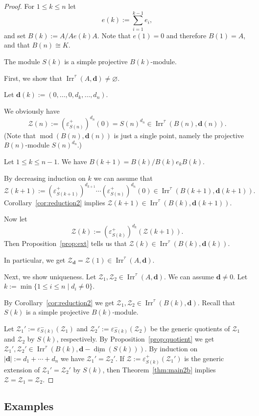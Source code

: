 \documentclass[12pt,reqno]{amsart}
\theoremstyle{definition}
\newcommand{\bd}{\mathbf{d}}
\newcommand{\md}{\operatorname{mod}}
\newcommand{\dimv}{\underline{\dim}}
\newcommand{\irr}{\operatorname{Irr}}
\newcommand{\calZ}{\mathcal{Z}}
\begin{document}
\begin{proof}
For $1 \le k \le n$ let
$$
e(k) := \sum_{i=1}^{k-1} e_i,
$$
and set $B(k) := A/Ae(k)A$.
Note that $e(1) = 0$ and therefore $B(1) = A$,
and that $B(n) \cong K$.

The module $S(k)$ is a simple projective $B(k)$-module.

First, we show that $\irr^\tau(A,\bd) \not= \varnothing$.

Let $\bd(k) := (0,\ldots,0,d_k,\ldots,d_n)$.

We obviously have
$$
\calZ(n) := (\varepsilon_{S(n)}^+)^{d_n}(0) = S(n)^{d_n} \in \irr^\tau(B(n),\bd(n)).
$$
(Note that $\md(B(n),\bd(n))$ is just a single point,
namely the projective $B(n)$-module $S(n)^{d_n}$.)

Let $1 \le k \le n-1$.
We have
$B(k+1) = B(k)/B(k)e_kB(k)$.

By decreasing induction on $k$ we can assume that
$$
\calZ(k+1) :=
(\varepsilon_{S(k+1)}^+)^{d_{k+1}} \cdots
(\varepsilon_{S(n)}^+)^{d_n}(0) \in
\irr^\tau(B(k+1),\bd(k+1)).
$$
Corollary~\ref{cor:reduction2} implies
$\calZ(k+1) \in \irr^\tau(B(k),\bd(k+1))$.

Now let
$$
\calZ(k) :=
(\varepsilon_{S(k)}^+)^{d_k}(\calZ(k+1)).
$$
Then
Proposition~\ref{prop:ext} tells us that
$\calZ(k) \in \irr^\tau(B(k),\bd(k))$.

In particular, we get
$\calZ_\bd = \calZ(1) \in \irr^\tau(A,\bd)$.

Next, we show uniqueness.
Let $\calZ_1, \calZ_2 \in \irr^\tau(A,\bd)$.
We can assume $\bd \not= 0$.
Let $k := \min\{ 1 \le i \le n \mid d_i \not= 0 \}$.

By Corollary~\ref{cor:reduction2} we get
$\calZ_1, \calZ_2 \in \irr^\tau(B(k),\bd)$.
Recall that $S(k)$ is a simple projective $B(k)$-module.

Let $\calZ_1' := \varepsilon_{S(k)}^-(\calZ_1)$ and
$\calZ_2' := \varepsilon_{S(k)}^-(\calZ_2)$ be the generic quotients of $\calZ_1$ and $\calZ_2$ by $S(k)$, respectively.
By  Proposition~\ref{prop:quotient} we get
$\calZ_1', \calZ_2' \in \irr^\tau(B(k),\bd - \dimv(S(k)))$.
By induction on $|\bd| := d_1 + \cdots + d_n$ we have
$\calZ_1' = \calZ_2'$.
If $\calZ := \varepsilon_{S(k)}^+(\calZ_1')$ is the generic extension of $\calZ_1' = \calZ_2'$ by $S(k)$, then Theorem~\ref{thm:main2b}
implies $\calZ = \calZ_1 = \calZ_2$.
\end{proof}


\subsection{Examples}\label{ex:reduction}
\end{document}
